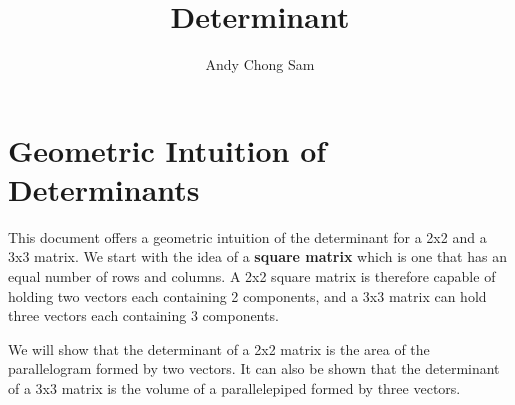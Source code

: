 \documentclass{article}
\begin{document}
	
	\title{Determinant}
	\author{Andy Chong Sam}
	
	\maketitle	
	
	\section{Geometric Intuition of Determinants}
	
	\par \noindent This document offers a geometric intuition of the determinant for a 2x2 and a 3x3 matrix. We start with the idea of a \textbf{square matrix} which is one that has an equal number of rows and columns. A 2x2 square matrix is therefore capable of holding two vectors each containing 2 components, and a 3x3 matrix can hold three vectors each containing 3 components.
	\newline
	\par \noindent We will show that the determinant of a 2x2 matrix is the area of the parallelogram formed by two vectors. It can also be shown that the determinant of a 3x3 matrix is the volume of a parallelepiped formed by three vectors.
\end{document}
